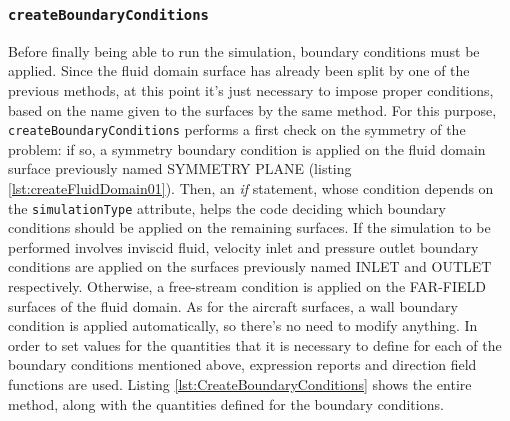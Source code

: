 \subsubsection{\texttt{createBoundaryConditions}}

Before finally being able to run the simulation, boundary conditions must be applied. Since the fluid domain surface has already been split by one of the previous methods, at this point it's just necessary to impose proper conditions, based on the name given to the surfaces by the same method. For this purpose, \lstinline[language=Java]!createBoundaryConditions! performs a first check on the symmetry of the problem: if so, a symmetry boundary condition is applied on the fluid domain surface previously named SYMMETRY PLANE (listing \ref{lst:createFluidDomain01}). Then, an \emph{if} statement, whose condition depends on the \lstinline[language=Java]!simulationType! attribute, helps the code deciding which boundary conditions should be applied on the remaining surfaces. If the simulation to be performed involves inviscid fluid, velocity inlet and pressure outlet boundary conditions are applied on the surfaces previously named INLET and OUTLET respectively. Otherwise, a free-stream condition is applied on the FAR-FIELD surfaces of the fluid domain. As for the aircraft surfaces, a wall boundary condition is applied automatically, so there's no need to modify anything. In order to set values for the quantities that it is necessary to define for each of the boundary conditions mentioned above, expression reports and direction field functions are used. Listing \ref{lst:CreateBoundaryConditions} shows the entire method, along with the quantities defined for the boundary conditions.
\bigskip
